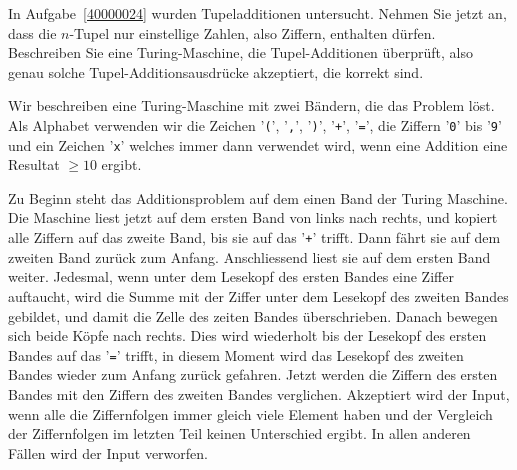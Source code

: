 In Aufgabe~\ref{40000024} wurden Tupeladditionen untersucht.
Nehmen Sie jetzt an,
dass die $n$-Tupel nur einstellige Zahlen, also Ziffern, enthalten
dürfen. Beschreiben Sie eine Turing-Maschine, die Tupel-Additionen
überprüft, also genau solche Tupel-Additionsausdrücke akzeptiert,
die korrekt sind.

\begin{loesung}
Wir beschreiben eine Turing-Maschine mit zwei Bändern, die das
Problem löst. Als Alphabet verwenden wir die Zeichen '{\tt (}',
'{\tt ,}', '{\tt )}', '{\tt +}', '{\tt =}', die Ziffern '{\tt 0}' bis '{\tt 9}'
und ein Zeichen '{\tt x}' welches immer dann verwendet wird, wenn eine
Addition eine Resultat $\ge 10$ ergibt.

Zu Beginn steht das Additionsproblem auf dem einen Band der Turing Maschine.
Die Maschine liest jetzt auf dem ersten Band von links nach rechts,
und kopiert alle Ziffern auf das zweite Band, bis sie auf das '{\tt +}'
trifft. Dann fährt sie auf dem zweiten Band zurück zum Anfang.
Anschliessend liest sie auf dem ersten Band weiter. Jedesmal, wenn unter
dem Lesekopf des ersten Bandes eine Ziffer auftaucht, wird die Summe mit der
Ziffer unter dem Lesekopf des zweiten Bandes gebildet, und damit die Zelle
des zeiten Bandes überschrieben. Danach bewegen sich beide Köpfe nach
rechts. Dies wird wiederholt bis der Lesekopf des ersten Bandes auf das
'{\tt =}' trifft, in diesem Moment wird das Lesekopf des zweiten Bandes
wieder zum Anfang zurück gefahren. Jetzt werden die Ziffern des ersten
Bandes mit den Ziffern des zweiten Bandes verglichen. Akzeptiert wird
der Input, wenn alle die Ziffernfolgen immer gleich viele Element haben
und der Vergleich der Ziffernfolgen im letzten Teil keinen Unterschied ergibt.
In allen anderen Fällen wird der Input verworfen.
\end{loesung}
